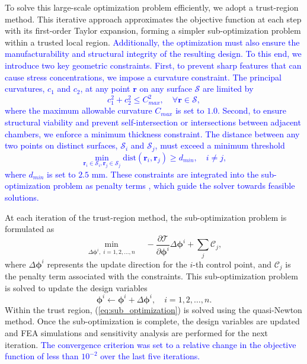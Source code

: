 \documentclass[journal]{IEEEtran}
\theoremstyle{definition}
\begin{document}
To solve this large-scale optimization problem efficiently, we adopt a trust-region method. This iterative approach approximates the objective function at each step with its first-order Taylor expansion, forming a simpler sub-optimization problem within a trusted local region. \textcolor{blue}{Additionally, the optimization must also ensure the manufacturability and structural integrity of the resulting design. To this end, we introduce two key geometric constraints. First, to prevent sharp features that can cause stress concentrations, we impose a curvature constraint. The principal curvatures, $c_1$ and $c_2$, at any point $\mathbf{r}$ on any surface $\mathcal{S}$ are limited by
\begin{equation}
    c_1^2 + c_2^2 \le C_{max}^2, \quad \forall \mathbf{r} \in \mathcal{S},
\end{equation}
where the maximum allowable curvature $C_{max}$ is set to $1.0$. Second, to ensure structural viability and prevent self-intersection or intersections between adjacent chambers, we enforce a minimum thickness constraint. The distance between any two points on distinct surfaces, $\mathcal{S}_i$ and $\mathcal{S}_j$, must exceed a minimum threshold
\begin{equation}
    \min_{\mathbf{r}_i \in \mathcal{S}_i, \mathbf{r}_j \in \mathcal{S}_j} \text{dist}(\mathbf{r}_i, \mathbf{r}_j) \ge d_{min}, \quad i \neq j,
\end{equation}
where $d_{min}$ is set to $2.5$ mm. These constraints are integrated into the sub-optimization problem as penalty terms \cite{chen_morphological_2023}, which guide the solver towards feasible solutions.} 

At each iteration of the trust-region method, the sub-optimization problem is formulated as
\begin{equation}
  \min_{\Delta \boldsymbol{\phi}^i,\; i=1,2,\dots,n} \quad -\frac{\partial\mathcal{T}}{\partial \boldsymbol{\phi}^i}\Delta \boldsymbol{\phi}^i + \sum_j \mathcal{C}_j,
  \label{eq:sub_optimization}
\end{equation}
where \(\Delta \boldsymbol{\phi}^i\) represents the update direction for the $i$-th control point, and \(\mathcal{C}_j\) is the penalty term associated with the constraints. This sub-optimization problem is solved to update the design variables
\begin{equation}
  \boldsymbol{\phi}^i \leftarrow \boldsymbol{\phi}^i + \Delta \boldsymbol{\phi}^i,\quad i=1,2,\dots,n.
  \label{eq:update_design_variable}
\end{equation}
Within the trust region, (\ref{eq:sub_optimization}) is solved using the quasi-Newton method. Once the sub-optimization is complete, the design variables are updated and FEA simulations and sensitivity analysis are performed for the next iteration. \textcolor{blue}{The convergence criterion was set to a relative change in the objective function of less than $10^{-2}$ over the last five iterations.}
\end{document}

